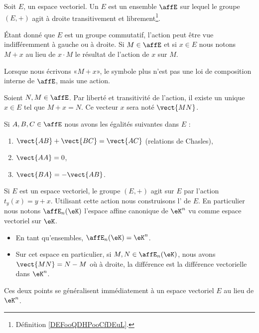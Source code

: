 
\begin{definition}
    Soit \( E\), un espace vectoriel. Un  \( E\) est un ensemble \( \affE\) sur lequel le groupe \( (E,+)\) agit à droite transitivement et librement\footnote{Définition \ref{DEFooQDHPooCfDEuL}.}.
\end{definition}

Étant donné que \( E\) est un groupe commutatif, l'action peut être vue indifféremment à gauche ou à droite. Si \( M\in\affE\) et si \( x\in E\) nous notons \( M+x\) au lieu de \( x\cdot M\) le résultat de l'action de \( x\) sur \( M\).

\begin{normaltext}      \label{NORMooZANAooQdXqlh}
    Lorsque nous écrivons «\( M+x\)», le symbole plus n'est pas une loi de composition interne de \( \affE\), mais une action.

    Soient \( N,M\in\affE\). Par liberté et transitivité de l'action, il existe un unique \( x\in E\) tel que \( M+x=N\). Ce vecteur \( x\) sera noté \( \vect{ MN }\).
\end{normaltext}

\begin{proposition}     \label{PROPooCOZCooCghwaR}
    Si \( A,B,C\in\affE\) nous avons les égalités suivantes dans \( E\) :
    \begin{enumerate}
        \item   \label{ITEMooSDMIooUQiKeW}
            \( \vect{ AB }+\vect{ BC }=\vect{ AC }\) (relations de Chasles),
        \item
            \( \vect{ AA }=0\),
        \item
            \( \vect{ BA }=-\vect{ AB }\).
    \end{enumerate}
\end{proposition}

\begin{normaltext}      \label{NORMooXAJLooIupekj}
    Si \( E\) est un espace vectoriel, le groupe \( (E,+)\) agit sur \( E\) par l'action \( t_y(x)=y+x\). Utilisant cette action nous construisons l' de \( E\). En particulier nous notons \( \affE_n(\eK)\) l'espace affine canonique de \( \eK^n\) vu comme espace vectoriel sur \( \eK\).
    \begin{itemize}
        \item
            En tant qu'ensembles, \( \affE_n(\eK)=\eK^n\).
        \item
            Sur cet espace en particulier, si \( M,N\in\affE_n(\eK)\), nous avons \( \vect{ MN }=N-M\) où à droite, la différence est la différence vectorielle dans \(\eK^n\).
    \end{itemize}

    Ces deux points se généralisent immédiatement à un espace vectoriel \( E\) au lieu de \( \eK^n\).
\end{normaltext}

